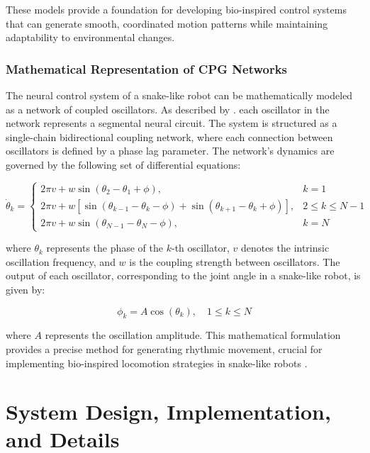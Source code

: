 \documentclass[12pt,a4paper]{report}
\begin{document}
These models provide a foundation for developing bio-inspired control systems that can generate smooth, coordinated motion patterns while maintaining adaptability to environmental changes.

\subsection{Mathematical Representation of CPG Networks}

The neural control system of a snake-like robot can be mathematically modeled as a network of coupled oscillators. As described by \textcite{wang2020cpg}. each oscillator in the network represents a segmental neural circuit. The system is structured as a single-chain bidirectional coupling network, where each connection between oscillators is defined by a phase lag parameter. The network's dynamics are governed by the following set of differential equations:

\begin{equation}
    \dot{\theta}_k =
    \begin{cases} 
        2\pi v + w \sin(\theta_2 - \theta_1 + \phi), & k = 1 \\
        2\pi v + w \left[\sin(\theta_{k-1} - \theta_k - \phi) + \sin(\theta_{k+1} - \theta_k + \phi)\right], & 2 \leq k \leq N-1 \\
        2\pi v + w \sin(\theta_{N-1} - \theta_N - \phi), & k = N
    \end{cases}
\end{equation}

where \( \theta_k \) represents the phase of the \( k \)-th oscillator, \( v \) denotes the intrinsic oscillation frequency, and \( w \) is the coupling strength between oscillators. The output of each oscillator, corresponding to the joint angle in a snake-like robot, is given by:

\begin{equation}
    \phi_k = A \cos(\theta_k), \quad 1 \leq k \leq N
\end{equation}

where \( A \) represents the oscillation amplitude. This mathematical formulation provides a precise method for generating rhythmic movement, crucial for implementing bio-inspired locomotion strategies in snake-like robots \cite{wang2020cpg}.


\chapter{System Design, Implementation, and Details}
\end{document}
